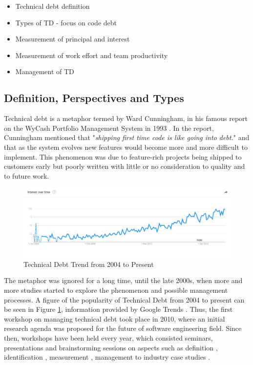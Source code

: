 \documentclass{mprop}
\begin{document}
\begin{itemize}
	\item Technical debt definition
	\item Types of TD - focus on code debt
	\item Measurement of principal and interest
	\item Measurement of work effort and team productivity
	\item Management of TD
\end{itemize}

\subsection{Definition, Perspectives and Types}

Technical debt is a metaphor termed by Ward Cunningham, in his famous report on the WyCash Portfolio Management System in 1993 \cite{Cunningham1993}.
In the report, Cunningham mentioned that "\textit{shipping first time code is like going into debt.}" and that as the system evolves new features would become more and more difficult to implement.
This phenomenon was due to feature-rich projects being shipped to customers early but poorly written with little or no consideration to quality and to future work.

\begin{figure}
	\centering
	\includegraphics[width=\linewidth]{visualisations/TD_trend.png}
	\caption{Technical Debt Trend from 2004 to Present}
	\label{fig:td-trend}
\end{figure}

The metaphor was ignored for a long time, until the late 2000s, when more and more studies started to explore the phenomenon and possible management processes.
A figure of the popularity of Technical Debt from 2004 to present can be seen in Figure \ref{fig:td-trend}, information provided by Google Trends \cite{GoogleTrends}.
Thus, the first workshop on managing technical debt took place in 2010, where an initial research agenda was proposed for the future of software engineering field.
Since then, workshops have been held every year, which consisted seminars, presentations and brainstorming sessions on aspects such as
definition \cite{Kruchten2012} \cite{Theodoropoulos2011} \cite{Schmid2013},
identification \cite{Ernst2012},
measurement \cite{Letouzey2012} \cite{Curtis2012} \cite{Nugroho2011} \cite{Zazworka2011} \cite{Fontana2012} \cite{Bohnet2011},
management \cite{Guo2011} \cite{Zazworka2011Prioritise} \cite{Seaman2012} to
industry case studies \cite{Lim2012} \cite{Morgenthaler2012} \cite{Codabux2013} \cite{Holvitie2014} \cite{Klinger2011}.
\end{document}
